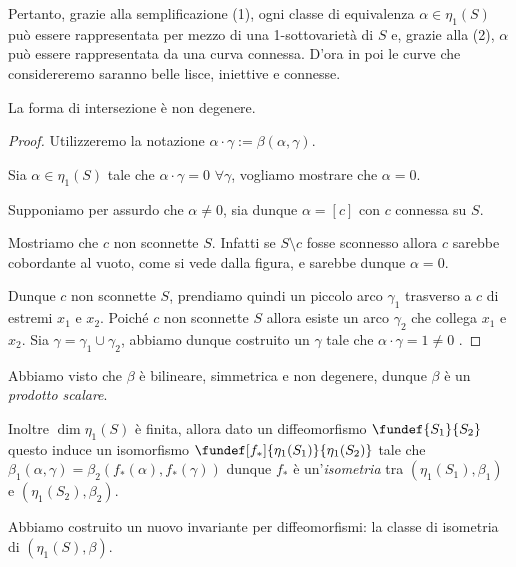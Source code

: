 Pertanto, grazie alla semplificazione (1), ogni classe di equivalenza  $\alpha \in \eta_1(S)$ può essere rappresentata per mezzo di una 1-sottovarietà di $S$ e, grazie alla (2), $\alpha$ può essere rappresentata da una curva connessa. D'ora in poi le curve che considereremo saranno belle lisce, iniettive e connesse.

\begin{teo}
 La forma di intersezione è non degenere.
\end{teo}

\begin{proof}
Utilizzeremo la notazione $\alpha \cdot \gamma := \beta(\alpha,\gamma)$.

Sia $\alpha \in \eta_1(S)$ tale che $\alpha \cdot \gamma = 0$  $\forall \gamma$, vogliamo mostrare che  $\alpha = 0$.

Supponiamo per assurdo che $\alpha \neq 0$, sia dunque $\alpha = [c]$ con $c$ connessa su $S$.

Mostriamo che $c$ non sconnette $S$. Infatti se $S \setminus c$ fosse sconnesso allora $c$ sarebbe cobordante al vuoto, come si vede dalla figura, e sarebbe dunque $\alpha = 0$.
\begin{center}
  
\end{center}
Dunque $c$ non sconnette $S$, prendiamo quindi un piccolo arco $\gamma_1$ trasverso a $c$ di estremi $x_1$ e $x_2$. Poiché $c$ non sconnette $S$ allora esiste un arco $\gamma_2$ che collega $x_1$ e $x_2$. Sia $\gamma = \gamma_1 \cup \gamma_2$, abbiamo dunque costruito un $\gamma$ tale che $\alpha \cdot \gamma = 1 \neq 0$ \absurd.
\end{proof}
\begin{center}
  
\end{center}

\begin{oss}
Abbiamo visto che $\beta$ è bilineare, simmetrica e non degenere, dunque $\beta$ è un \emph{prodotto scalare}.

Inoltre $\dim \eta_1(S)$ è finita, allora dato un diffeomorfismo $\fundef{S_1}{S_2}$ questo induce un isomorfismo $\fundef[f_*]{\eta_1(S_1)}{\eta_1(S_2)}$ tale che $\beta_1(\alpha,\gamma) = \beta_2(f_*(\alpha),f_*(\gamma))$ dunque $f_*$ è un'\emph{isometria} tra $(\eta_1(S_1), \beta_1)$ e $(\eta_1(S_2), \beta_2)$.

Abbiamo costruito un nuovo invariante per diffeomorfismi: la classe di isometria di $(\eta_1(S), \beta)$.
\end{oss}
